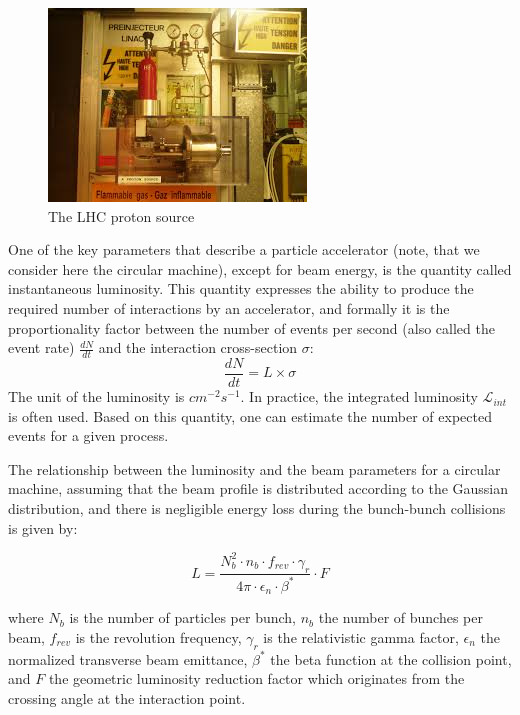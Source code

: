 \begin{figure}
\centering
\includegraphics[scale=0.6]{figures/Bottle.jpg}
\caption{The LHC proton source 
\label{fig:Bottle}}
\end{figure}

One of the key parameters that describe a particle accelerator (note, that we consider here the circular machine), except for beam energy, is the quantity called instantaneous luminosity.  This quantity expresses the ability to produce the required number of interactions by an accelerator, and formally it is the proportionality factor between the number of events per second (also called the event rate) $\frac{dN}{dt}$ and the interaction cross-section $\sigma$:
\begin{equation}
   \frac{dN}{dt} = L \times \sigma 
\end{equation}
The unit of the luminosity is $cm^{-2}s^{-1}$.
In practice, the integrated luminosity $\mathcal{L}_{int}$ is often used. Based on this quantity, one can estimate the number of expected events for a given process.  

The relationship between the luminosity and the beam parameters for a circular machine, assuming that the beam profile is distributed according to the Gaussian distribution, and there is negligible energy loss during the bunch-bunch collisions is given by:

\begin{equation}
    L = \frac{N_{b}^2 \cdot n_b  \cdot f_{rev}  \cdot \gamma_{r}}{4 \pi \cdot \epsilon_n  \cdot \beta^* }  \cdot F
\end{equation}

where $N_b$ is the number of particles per bunch, $n_b$ the number of bunches per beam, $f_{rev}$ is the revolution frequency, $\gamma_{r}$ is the relativistic gamma factor, $\epsilon_n$ the normalized transverse beam emittance, $\beta^*$ the beta function at the  collision point, and $F$ the geometric luminosity reduction factor which originates from the crossing angle at the interaction point. 


